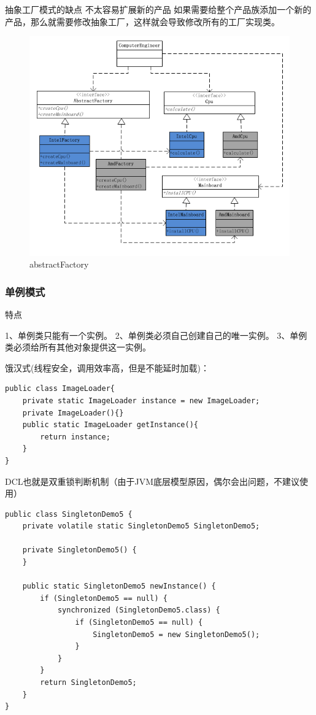 \documentclass[UTF8]{ctexart}
\begin{document}
抽象工厂模式的缺点
不太容易扩展新的产品
如果需要给整个产品族添加一个新的产品，那么就需要修改抽象工厂，这样就会导致修改所有的工厂实现类。

\begin{figure}
	\centering
	\includegraphics[width=0.7\linewidth]{figures/abstractFactory.png}
	\caption{abstractFactory}
	\label{fig:abstractFactory}
\end{figure}

\subsubsection{单例模式}
特点

1、单例类只能有一个实例。
2、单例类必须自己创建自己的唯一实例。
3、单例类必须给所有其他对象提供这一实例。

饿汉式(线程安全，调用效率高，但是不能延时加载)：
\begin{lstlisting}
public class ImageLoader{ 
	private static ImageLoader instance = new ImageLoader; 
	private ImageLoader(){} 
	public static ImageLoader getInstance(){  
		return instance;  
	} 
}
\end{lstlisting}

DCL也就是双重锁判断机制（由于JVM底层模型原因，偶尔会出问题，不建议使用）
\begin{lstlisting}
public class SingletonDemo5 {
	private volatile static SingletonDemo5 SingletonDemo5;
	
	private SingletonDemo5() {
	}
	
	public static SingletonDemo5 newInstance() {
		if (SingletonDemo5 == null) {
			synchronized (SingletonDemo5.class) {
				if (SingletonDemo5 == null) {
					SingletonDemo5 = new SingletonDemo5();
				}
			}
		}
		return SingletonDemo5;
	}
}
\end{lstlisting}
\end{document}
